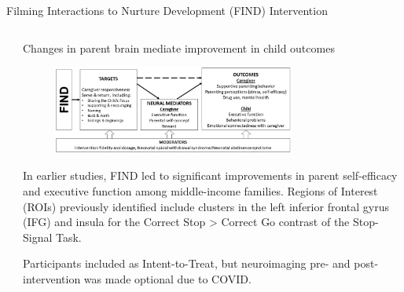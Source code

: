 \documentclass[final]{beamer}
\begin{document}
\begin{frame}[t]
\begin{columns}[t]
\begin{column}{\textwidth}
\begin{block}{Filming Interactions to Nurture Development (FIND) Intervention}
\begin{columns}[t]
\begin{column}{0.48\textwidth}
      \end{column}

      \begin{column}{0.48\textwidth}
              \vspace{-0.4cm}  %
    \begin{block}{Changes in parent brain mediate improvement in child outcomes}
        \begin{figure}[ht]
          \centering
          \includegraphics[clip, width=0.75\textwidth]{model.png}
          \label{fig:model}
        \end{figure}
        \vspace{-0.25cm}
        In earlier studies, FIND led to significant improvements in parent self-efficacy\supercite{liuImprovingCaregiverSelfEfficacy2021} and executive function\supercite{giulianiPreliminaryStudyInvestigating2019} among middle-income families. Regions of Interest (ROIs) previously identified include clusters in the left inferior frontal gyrus (IFG) and insula for the Correct Stop > Correct Go contrast of the Stop-Signal Task.
        \end{block}

    \begin{block}{Participants included as Intent-to-Treat, but neuroimaging pre- and post-intervention was made optional due to COVID.}

\end{block}
\end{column}
\end{columns}
\end{block}
\end{column}
\end{columns}
\end{frame}
\end{document}
